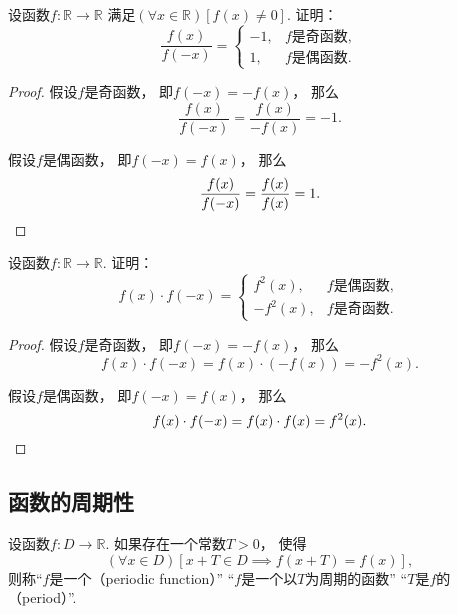 \begin{example}
设函数\(f\colon\mathbb{R}\to\mathbb{R}\)
满足\((\forall x\in\mathbb{R})[f(x)\neq0]\).
证明：\begin{equation*}
	\frac{f(x)}{f(-x)} = \left\{ \begin{array}{rl}
		-1, & \text{$f$是奇函数}, \\
		1, & \text{$f$是偶函数}.
	\end{array} \right.
\end{equation*}
\begin{proof}
假设\(f\)是奇函数，
即\(f(-x)=-f(x)\)，
那么\begin{equation*}
	\frac{f(x)}{f(-x)}
	=\frac{f(x)}{-f(x)}
	=-1.
\end{equation*}

假设\(f\)是偶函数，
即\(f(-x)=f(x)\)，
那么\begin{equation*}
	\frac{f(x)}{f(-x)}
	=\frac{f(x)}{f(x)}
	=1.
	\qedhere
\end{equation*}
\end{proof}
\end{example}

\begin{example}
设函数\(f\colon\mathbb{R}\to\mathbb{R}\).
证明：\begin{equation*}
	f(x) \cdot f(-x) = \left\{ \begin{array}{rl}
		f^2(x), & \text{$f$是偶函数}, \\
		-f^2(x), & \text{$f$是奇函数}.
	\end{array} \right.
\end{equation*}
\begin{proof}
假设\(f\)是奇函数，
即\(f(-x)=-f(x)\)，
那么\begin{equation*}
	f(x) \cdot f(-x)
	=f(x) \cdot (-f(x))
	=-f^2(x).
\end{equation*}

假设\(f\)是偶函数，
即\(f(-x)=f(x)\)，
那么\begin{equation*}
	f(x) \cdot f(-x)
	=f(x) \cdot f(x)
	=f^2(x).
	\qedhere
\end{equation*}
\end{proof}
\end{example}

\subsection{函数的周期性}
\begin{definition}
设函数\(f\colon D\to\mathbb{R}\).
如果存在一个常数\(T>0\)，
使得\begin{equation*}
	(\forall x \in D)
	[x+T \in D \implies f(x+T) = f(x)],
\end{equation*}
则称“\(f\)是一个（periodic function）”
“\(f\)是一个以\(T\)为周期的函数”
“\(T\)是\(f\)的（period）”.
\end{definition}

